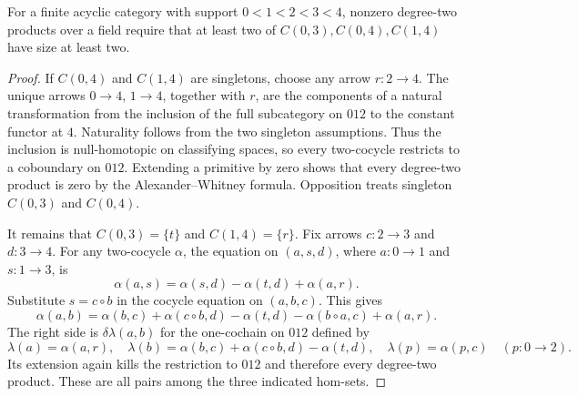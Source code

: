 \begin{proposition}[Proved]\label{A7:long-composite-gates}
For a finite acyclic category with support $0<1<2<3<4$, nonzero
degree-two products over a field require that at least two of
$C(0,3),C(0,4),C(1,4)$ have size at least two.
\end{proposition}
\begin{proof}
If $C(0,4)$ and $C(1,4)$ are singletons, choose any arrow
$r:2\to4$. The unique arrows $0\to4$, $1\to4$, together with
$r$, are the components of a natural transformation from the
inclusion of the full subcategory on $012$ to the constant functor
at $4$. Naturality follows from the two singleton assumptions.
Thus the inclusion is null-homotopic on classifying spaces, so
every two-cocycle restricts to a coboundary on $012$.
Extending a primitive by zero shows that every degree-two product
is zero by the Alexander--Whitney formula. Opposition treats
singleton $C(0,3)$ and $C(0,4)$.

It remains that $C(0,3)=\{t\}$ and $C(1,4)=\{r\}$.
Fix arrows $c:2\to3$ and $d:3\to4$. For any two-cocycle $\alpha$,
the equation on $(a,s,d)$, where $a:0\to1$ and $s:1\to3$,
is
\[
 \alpha(a,s)=\alpha(s,d)-\alpha(t,d)+\alpha(a,r).
\]
Substitute $s=c\circ b$ in the cocycle equation on $(a,b,c)$.
This gives
\[
 \alpha(a,b)=\alpha(b,c)+\alpha(c\circ b,d)-\alpha(t,d)
             -\alpha(b\circ a,c)+\alpha(a,r).
\]
The right side is $\delta\lambda(a,b)$ for the one-cochain on
$012$ defined by
\[
 \lambda(a)=\alpha(a,r),\quad
 \lambda(b)=\alpha(b,c)+\alpha(c\circ b,d)-\alpha(t,d),\quad
 \lambda(p)=\alpha(p,c)\quad(p:0\to2).
\]
Its extension again kills the restriction to $012$ and therefore
every degree-two product. These are all pairs among the three
indicated hom-sets.
\end{proof}

